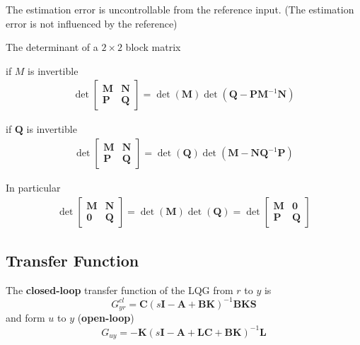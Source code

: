 \newpar{}

The estimation error is uncontrollable from the reference input. (The estimation error is not influenced by the reference)

\newpar{}

The determinant of a $2\times2$ block matrix

if $M$ is invertible
\begin{align*}
    \det\begin{bmatrix}
            \mathbf{M} & \mathbf{N} \\
            \mathbf{P} & \mathbf{Q}
        \end{bmatrix}
    = \det(\mathbf{M})\det(\mathbf{Q}-\mathbf{PM}^{-1}\mathbf{N})
\end{align*}

if $\mathbf{Q}$ is invertible
\begin{align*}
    \det\begin{bmatrix}
            \mathbf{M} & \mathbf{N} \\
            \mathbf{P} & \mathbf{Q}
        \end{bmatrix}
    = \det(\mathbf{Q})\det(\mathbf{M}-\mathbf{NQ}^{-1}\mathbf{P})
\end{align*}

In particular
\begin{align*}
    \det\begin{bmatrix}
            \mathbf{M} & \mathbf{N} \\
            \mathbf{0} & \mathbf{Q}
        \end{bmatrix}
    = \det(\mathbf{M})\det(\mathbf{Q}) =
    \det\begin{bmatrix}
            \mathbf{M} & \mathbf{0} \\
            \mathbf{P} & \mathbf{Q}
        \end{bmatrix}
\end{align*}

\subsection{Transfer Function}
The \textbf{closed-loop} transfer function of the LQG from $r$ to $y$ is
\begin{equation*}
    G_{yr}^{cl} = \mathbf{C}{(s\mathbf{I}-\mathbf{A}+\mathbf{BK})}^{-1}\mathbf{BKS}
\end{equation*}
and form $u$ to $y$ (\textbf{open-loop})
\begin{equation*}
    G_{uy} = -\mathbf{K}{(s\mathbf{I}-\mathbf{A}+\mathbf{LC}+\mathbf{BK})}^{-1}\mathbf{L}
\end{equation*}

